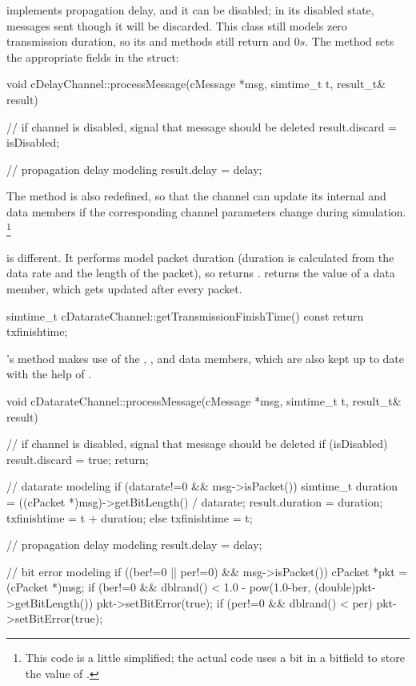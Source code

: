  implements propagation delay, and it can be
disabled; in its disabled state, messages sent though it will be discarded.
This class still models zero transmission duration, so its
 and 
methods still return  and $0s$. The  method
sets the appropriate fields in the  struct:

\begin{cpp}
void cDelayChannel::processMessage(cMessage *msg, simtime_t t, result_t& result)
{
    // if channel is disabled, signal that message should be deleted
    result.discard = isDisabled;

    // propagation delay modeling
    result.delay = delay;
}
\end{cpp}

The  method is also redefined, so that
the channel can update its internal  and 
data members if the corresponding channel parameters change during simulation.
\footnote{This code is a little simplified; the actual code uses a bit
in a bitfield to store the value of .}

 is different. It performs model packet duration
(duration is calculated from the data rate and the length of the packet),
so  returns .
 returns the value of a 
data member, which gets updated after every packet.

\begin{cpp}
simtime_t cDatarateChannel::getTransmissionFinishTime() const
{
    return txfinishtime;
}
\end{cpp}

's  method makes use of
the , ,  and  data
members, which are also kept up to date with the help of
.

\begin{cpp}
void cDatarateChannel::processMessage(cMessage *msg, simtime_t t, result_t& result)
{
    // if channel is disabled, signal that message should be deleted
    if (isDisabled) {
        result.discard = true;
        return;
    }

    // datarate modeling
    if (datarate!=0 && msg->isPacket()) {
        simtime_t duration = ((cPacket *)msg)->getBitLength() / datarate;
        result.duration = duration;
        txfinishtime = t + duration;
    }
    else {
        txfinishtime = t;
    }

    // propagation delay modeling
    result.delay = delay;

    // bit error modeling
    if ((ber!=0 || per!=0) && msg->isPacket())
    {
        cPacket *pkt = (cPacket *)msg;
        if (ber!=0 && dblrand() < 1.0 - pow(1.0-ber, (double)pkt->getBitLength())
            pkt->setBitError(true);
        if (per!=0 && dblrand() < per)
            pkt->setBitError(true);
    }
}
\end{cpp}



